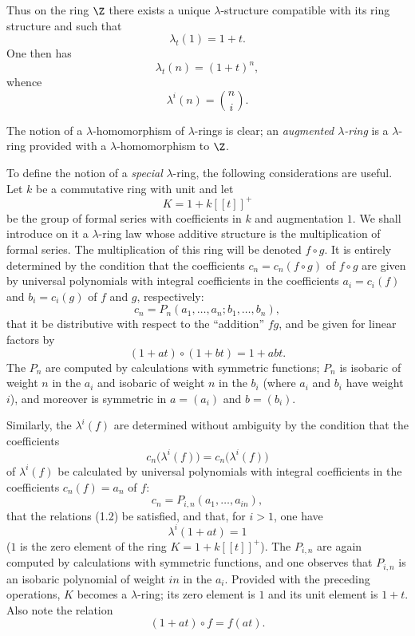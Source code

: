 Thus on the ring $\Z$ there exists a unique $\lambda$-structure compatible with its ring structure and such that
\begin{equation}\tag{1.4}
\lambda_t(1)=1+t .
\end{equation}
One then has
\begin{equation}\tag{1.5}
\lambda_t(n)=(1+t)^n,
\end{equation}
whence
\[
\lambda^i(n)=\binom{n}{i}.
\]

The notion of a $\lambda$-homomorphism of $\lambda$-rings is clear; an \emph{augmented $\lambda$-ring} is a $\lambda$-ring provided with a $\lambda$-homomorphism to $\Z$.

To define the notion of a \emph{special} $\lambda$-ring, the following considerations are useful. Let $k$ be a commutative ring with unit and let
\[
K=1+k[[t]]^+
\]
be the group of formal series with coefficients in $k$ and augmentation $1$. We shall introduce on it a $\lambda$-ring law whose additive structure is the multiplication of formal series. The multiplication of this ring will be denoted $f\circ g$. It is entirely determined by the condition that the coefficients $c_n=c_n(f\circ g)$ of $f\circ g$ are given by universal polynomials with integral coefficients in the coefficients $a_i=c_i(f)$ and $b_i=c_i(g)$ of $f$ and $g$, respectively:
\begin{equation}\tag{1.6}
c_n=P_n(a_1,\ldots,a_n;b_1,\ldots,b_n),
\end{equation}
that it be distributive with respect to the ``addition'' $fg$, and be given for linear factors by
\begin{equation}\tag{1.7}
(1+at)\circ(1+bt)=1+abt.
\end{equation}
The $P_n$ are computed by calculations with symmetric functions; $P_n$ is isobaric of weight $n$ in the $a_i$ and isobaric of weight $n$ in the $b_i$ (where $a_i$ and $b_i$ have weight $i$), and moreover is symmetric in $a=(a_i)$ and $b=(b_i)$.

Similarly, the $\lambda^i(f)$ are determined without ambiguity by the condition that the coefficients
\[
c_n\bigl(\lambda^i(f)\bigr)=c_n\bigl(\lambda^i(f)\bigr)
\]
of $\lambda^i(f)$ be calculated by universal polynomials with integral coefficients in the coefficients $c_n(f)=a_n$ of $f$:
\begin{equation}\tag{1.8}
c_n=P_{i,n}(a_1,\ldots,a_{in}),
\end{equation}
that the relations (1.2) be satisfied, and that, for $i>1$, one have
\begin{equation}\tag{1.9}
\lambda^i(1+at)=1
\end{equation}
($1$ is the zero element of the ring $K=1+k[[t]]^+$). The $P_{i,n}$ are again computed by calculations with symmetric functions, and one observes that $P_{i,n}$ is an isobaric polynomial of weight $in$ in the $a_i$. Provided with the preceding operations, $K$ becomes a $\lambda$-ring; its zero element is $1$ and its unit element is $1+t$. Also note the relation
\begin{equation}\tag{1.7 bis}
(1+at)\circ f=f(at).
\end{equation}

